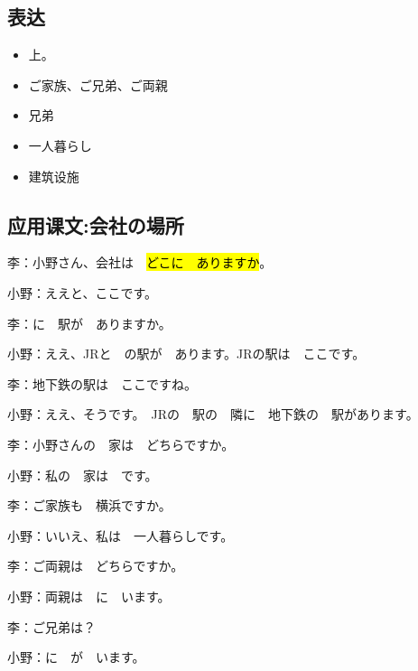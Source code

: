 \subsection{表达}

\begin{itemize}
    \item 上。
    \item ご家族、ご兄弟、ご両親
    \item 兄弟
    \item 一人暮らし
    \item 建筑设施
\end{itemize}

\subsection{应用课文:会社の場所}

李：小野さん、会社は　\hl{どこに　ありますか}。

小野：ええと、ここです。

李：に　駅が　ありますか。

小野：ええ、JRと　の駅が　あります。JRの駅は　ここです。

李：地下鉄の駅は　ここですね。

小野：ええ、そうです。　JRの　駅の　隣に　地下鉄の　駅があります。

\vspace{1em}

李：小野さんの　家は　どちらですか。

小野：私の　家は　です。

李：ご家族も　横浜ですか。

小野：いいえ、私は　一人暮らしです。

李：ご両親は　どちらですか。

小野：両親は　に　います。

李：ご兄弟は？

小野：に　が　います。

\begin{vocablist}[2]
\end{vocablist}
